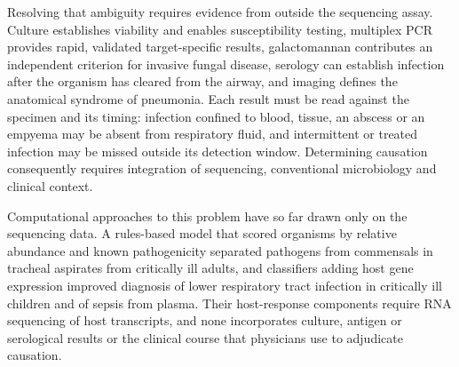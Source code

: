 Resolving that ambiguity requires evidence from outside the sequencing assay. Culture establishes viability and enables susceptibility testing\cite{metlay2019diagnosis,kalil2016management}, multiplex PCR provides rapid, validated target-specific results\cite{buchan2020practical}, galactomannan contributes an independent criterion for invasive fungal disease\cite{donnelly2020revision}, serology can establish infection after the organism has cleared from the airway, and imaging defines the anatomical syndrome of pneumonia\cite{metlay2019diagnosis}. Each result must be read against the specimen and its timing: infection confined to blood, tissue, an abscess or an empyema may be absent from respiratory fluid, and intermittent or treated infection may be missed outside its detection window\cite{gu2019clinical,miller2022role,schlaberg2017validation}. Determining causation consequently requires integration of sequencing, conventional microbiology and clinical context.

Computational approaches to this problem have so far drawn only on the sequencing data. A rules-based model that scored organisms by relative abundance and known pathogenicity separated pathogens from commensals in tracheal aspirates from critically ill adults\cite{langelier2018integrating}, and classifiers adding host gene expression improved diagnosis of lower respiratory tract infection in critically ill children\cite{mick2023integrated} and of sepsis from plasma\cite{kalantar2022integrated}. Their host-response components require RNA sequencing of host transcripts, and none incorporates culture, antigen or serological results or the clinical course that physicians use to adjudicate causation.

